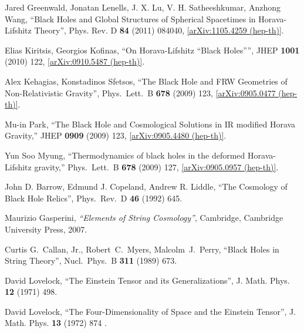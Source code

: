 \documentclass[12pt]{article}
\newcommand{\2}{$^2$}
\newcommand{\3}{$^3$}
\newcommand{\4}{$_4$}
\newcommand{\5}{$_5$}
\begin{document}
\begin{thebibliography}{400}
Jared Greenwald, Jonatan Lenells, J. X. Lu, V. H. Satheeshkumar, Anzhong Wang, ``Black Holes and Global Structures of Spherical Spacetimes in Horava-Lifshitz Theory'', Phys. Rev. D \textbf{84} (2011) 084040, \href{http://arxiv.org/abs/1105.4259}{[arXiv:1105.4259 (hep-th)]}.

Elias Kiritsis, Georgios Kofinas, ``On Horava-Lifshitz ``Black Holes'''', JHEP \textbf{1001} (2010) 122, \href{http://arxiv.org/abs/0910.5487}{[arXiv:0910.5487 (hep-th)]}.
  
Alex Kehagias, Konstadinos Sfetsos,
  ``The Black Hole and FRW Geometries of Non-Relativistic Gravity'',
  Phys.\ Lett.\ B {\bf 678} (2009) 123, 
  \href{http://arxiv.org/abs/0905.0477}{[arXiv:0905.0477 (hep-th)]}.

Mu-in Park,
  ``The Black Hole and Cosmological Solutions in IR modified Horava Gravity,''
  JHEP {\bf 0909} (2009) 123,
  \href{http://arxiv.org/abs/0905.4480}{[arXiv:0905.4480 (hep-th)]}.

Yun Soo Myung,
  ``Thermodynamics of black holes in the deformed Horava-Lifshitz gravity,''
  Phys.\ Lett.\ B {\bf 678} (2009) 127,
  \href{http://arxiv.org/abs/0905.0957}{[arXiv:0905.0957 (hep-th)]}.


John D. Barrow, Edmund J. Copeland, Andrew R. Liddle,
  ``The Cosmology of Black Hole Relics'',
  Phys.\ Rev.\ D {\bf 46} (1992) 645.

  Maurizio Gasperini, {\it ``Elements of String Cosmology''}, Cambridge, Cambridge University Press, 2007.

  Curtis G.~Callan, Jr., Robert~C.~Myers, Malcolm~J.~Perry,
  ``Black Holes in String Theory'',
  Nucl.\ Phys.\ B {\bf 311} (1989) 673.

David Lovelock, ``The Einstein Tensor and its Generalizations'', J. Math. Phys. {\bf 12} (1971) 498.

David Lovelock, ``The Four-Dimensionality of Space and the Einstein Tensor'', J. Math. Phys. {\bf 13} (1972) 874 .


\end{thebibliography}
\end{document}
